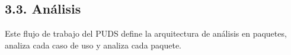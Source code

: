 \subsection{3.3. Análisis}\label{sec:v2_analisis}

Este flujo de trabajo del PUDS define la arquitectura de análisis en paquetes, analiza cada caso de uso y analiza cada paquete.




